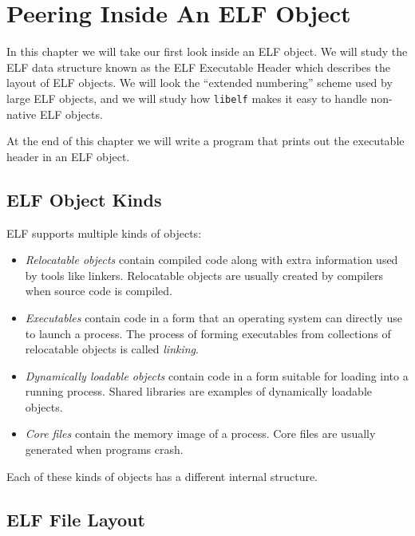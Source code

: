 \documentclass[a4paper,pdftex]{book}
\newcommand{\firstterm}[1]{\textit{#1}}
\newcommand{\library}[1]{\texttt{#1}}
\newcommand{\elfdatastructure}[1]{\textsf{#1}}
\begin{document}
\chapter{Peering Inside An ELF Object}\label{chap.peering-inside}

In this chapter we will take our first look inside an ELF object. We
will study the ELF data structure known as the ELF
\elfdatastructure{Executable Header} which describes the layout of ELF
objects.  We will look the ``extended numbering'' scheme used by
large ELF objects, and we will study how \library{libelf} makes
it easy to handle non-native ELF objects.

At the end of this chapter we will write a program that prints out
the executable header in an ELF object.

\section{ELF Object Kinds}
ELF supports multiple kinds of objects:

\begin{itemize}
\item \firstterm{Relocatable objects}
  contain compiled code along with extra information used by tools
  like linkers. Relocatable objects are usually created by compilers
  when source code is compiled.
\item \firstterm{Executables} contain
  code in a form that an operating system can directly use to launch a
  process.  The process of forming executables from collections of
  relocatable objects is called
  \firstterm{linking}.
\item \firstterm{Dynamically loadable objects} contain code in a form suitable for
  loading into a running process. Shared
  libraries are examples of dynamically loadable
  objects.
\item \firstterm{Core files} contain the memory
  image of a process. Core files are usually generated when programs
  crash.
\end{itemize}

Each of these kinds of objects has a different internal structure.

\section{ELF File Layout}
\end{document}
